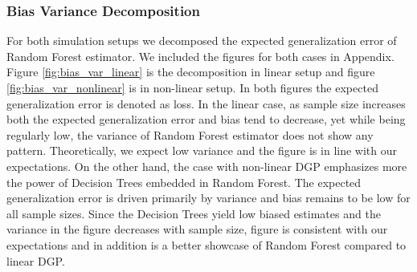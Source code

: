 \subsubsection{Bias Variance Decomposition}
For both simulation setups we decomposed the 
expected generalization error of 
Random Forest estimator. We included the figures for both 
cases in Appendix. 
Figure \ref{fig:bias_var_linear} is the decomposition in 
linear setup and 
figure \ref{fig:bias_var_nonlinear} is in non-linear setup. 
In both figures the expected generalization error 
is denoted as loss. 
In the linear case, as sample size increases both 
the expected generalization error and bias tend to decrease, 
yet while being regularly low, the variance of 
Random Forest estimator does not show any pattern. 
Theoretically, we expect low variance and 
the figure is in line with our expectations.
On the other hand, the case with non-linear DGP emphasizes 
more the power of Decision Trees embedded in Random Forest. 
The expected generalization error is driven primarily 
by variance and bias remains to be low for all sample sizes. 
Since the Decision Trees yield low biased estimates and 
the variance in the figure decreases with sample size, 
figure is consistent with our expectations and in addition is
a better showcase of Random Forest compared to linear DGP.